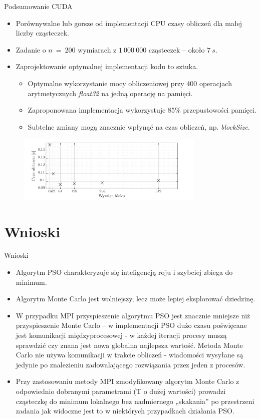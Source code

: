 \documentclass[handout]{beamer}
\begin{document}
\begin{frame}{Podsumowanie CUDA}
\begin{itemize}
\item Porównywalne lub gorsze od implementacji CPU czasy obliczeń dla małej liczby cząsteczek.
\item Zadanie o $n \ = \ 200$ wymiarach z $1 \ 000 \ 000$ cząsteczek -- około $7 \ s$.
\item Zaprojektowanie optymalnej implementacji kodu to sztuka.
\begin{itemize}
\item Optymalne wykorzystanie mocy obliczeniowej przy 400 operacjach arytmetycznych \textit{float32} na jedną operację na pamięci.
\item Zaproponowana implementacja wykorzystuje $85\% $ przepustowości pamięci.
\item Subtelne zmiany mogą znacznie wpłynąć na czas obliczeń, np. \textit{blockSize}.
\end{itemize}
\end{itemize}
\begin{figure}[t]
\includegraphics[width=0.8\textwidth]{grafiki/blocksizeplot.pdf}
\end{figure}
\end{frame}





\section{Wnioski}
\begin{frame}{Wnioski}
\begin{itemize}
\item Algorytm PSO charakteryzuje się inteligencją roju i szybciej zbiega do minimum.
\item Algorytm Monte Carlo jest wolniejszy, lecz może lepiej eksplorować dziedzinę.
\item W przypadku MPI przyspieszenie algorytmu PSO jest znacznie mniejsze niż przyspieszenie Monte Carlo -- w implementacji PSO dużo czasu poświęcane jest komunikacji międzyprocesowej - w każdej iteracji procesy muszą sprawdzić czy znana jest nowa globalna najlepsza wartość. Metoda Monte Carlo nie używa komunikacji w trakcie obliczeń - wiadomości wysyłane są jedynie po znalezieniu zadowalającego rozwiązania przez jeden z procesów.
\item Przy zastosowaniu metody MPI zmodyfikowany algorytm Monte Carlo z odpowiednio dobranymi parametrami (T o dużej wartości) prowadzi cząsteczkę do minimum lokalnego bez nadmiernego „skakania” po przestrzeni zadania jak widoczne jest to w niektórych przypadkach działania PSO.
\end{itemize}
\end{frame}
\end{document}
